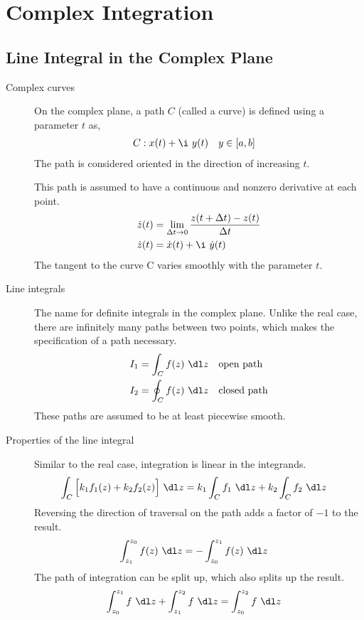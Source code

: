 \chapter{Complex Integration}

\section{Line Integral in the Complex Plane}

\begin{description}
    \item[Complex curves] On the complex plane, a path $ C $ (called a curve) is defined
        using a parameter $ t $ as,
        \begin{align}
            C & : x(t) + \i\ y(t) & y & \in [a,b]
        \end{align}
        The path is considered oriented in the direction of increasing $ t $. \par
        This path is assumed to have a continuous and nonzero derivative at each
        point.
        \begin{align}
            \dot{z}(t) & = \lim_{\Delta t \to 0} \frac{z(t + \Delta t) - z(t)}
            {\Delta t}                                                         \\
            \dot{z}(t) & = \dot{x}(t) + \i\ \dot{y}(t)
        \end{align}
        The tangent to the curve C varies smoothly with the parameter $ t $.

    \item[Line integrals]  The name for definite integrals in the complex plane. Unlike
        the real case, there are infinitely many paths between two points, which makes
        the specification of a path necessary.
        \begin{align}
            I_1 & = \int_C f(z)\ \dl z  &  & \text{open path}   \\
            I_2 & = \oint_C f(z)\ \dl z &  & \text{closed path}
        \end{align}
        These paths are assumed to be at least piecewise smooth.

    \item[Properties of the line integral] Similar to the real case, integration is
        linear in the integrands.
        \begin{align}
            \int_C \Big[k_1f_1(z) + k_2 f_2(z)\Big]\ \dl z &
            = k_1 \int_C f_1\ \dl z + k_2 \int_C f_2\ \dl z
        \end{align}
        Reversing the direction of traversal on the path adds a factor of $ -1 $ to the
        result.
        \begin{align}
            \int_{z_1}^{z_0} f(z)\ \dl z & = -\int_{z_0}^{z_1} f(z)\ \dl z
        \end{align}
        The path of integration can be split up, which also splits up the result.
        \begin{align}
            \int_{z_0}^{z_1} f\ \dl z + \int_{z_1}^{z_2} f\ \dl z
             & = \int_{z_0}^{z_2} f\ \dl z
        \end{align}


\end{description}
